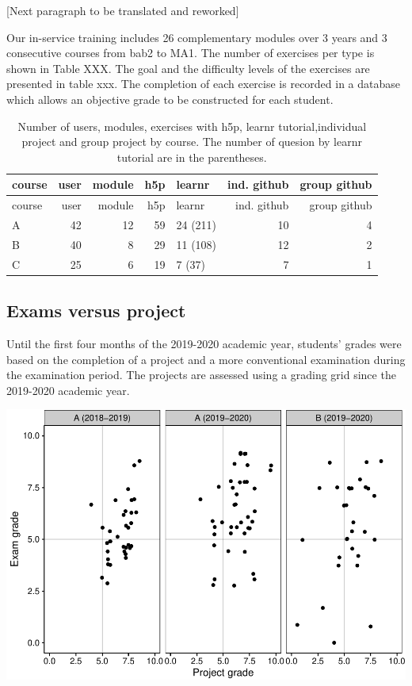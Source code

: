 \documentclass[
]{article}
\begin{document}
{[}Next paragraph to be translated and reworked{]}

Our in-service training includes 26 complementary modules over 3 years
and 3 consecutive courses from bab2 to MA1. The number of exercises per
type is shown in Table XXX. The goal and the difficulty levels of the
exercises are presented in table xxx. The completion of each exercise is
recorded in a database which allows an objective grade to be constructed
for each student.

\begin{longtable}[]{@{}lrrrlrr@{}}
\caption{Number of users, modules, exercises with h5p, learnr
tutorial,individual project and group project by course. The number of
quesion by learnr tutorial are in the parentheses.}\tabularnewline
\toprule
course & user & module & h5p & learnr & ind. github & group github \\
\midrule
\endfirsthead
\toprule
course & user & module & h5p & learnr & ind. github & group github \\
\midrule
\endhead
A & 42 & 12 & 59 & 24 (211) & 10 & 4 \\
B & 40 & 8 & 29 & 11 (108) & 12 & 2 \\
C & 25 & 6 & 19 & 7 (37) & 7 & 1 \\
\bottomrule
\end{longtable}

\hypertarget{exams-versus-project}{%
\subsection{Exams versus project}\label{exams-versus-project}}

Until the first four months of the 2019-2020 academic year, students'
grades were based on the completion of a project and a more conventional
examination during the examination period. The projects are assessed
using a grading grid since the 2019-2020 academic year.

\includegraphics{teaching_data_science_files/figure-latex/unnamed-chunk-3-1.pdf}
\end{document}
